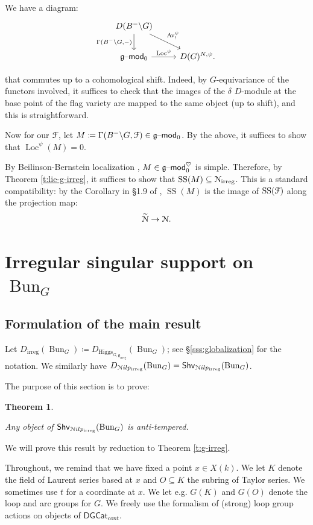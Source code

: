 \documentclass[reqno,11pt]{amsart}
\numberwithin{equation}{subsection}
\newtheorem{thm}{Theorem}[subsubsection]
\theoremstyle{remark}
\newcommand{\Loc}{\on{Loc}}
\newcommand{\sF}{{\EuScript F}}
\newcommand{\sN}{{\EuScript N}}
\newcommand{\fg}{{\mathfrak g}}
\newcommand{\on}{\operatorname}
\newcommand{\mathendash}{\text{\textendash}}
\newcommand{\Bun}{\on{Bun}}
\renewcommand{\mod}{\mathendash\mathsf{mod}}
\newcommand{\DGCat}{\mathsf{DGCat}}
\newcommand{\heart}{\heartsuit}
\newcommand{\Av}{\on{Av}}
\renewcommand{\subset}{\subseteq}
\newcommand{\Shv}{\mathsf{Shv}}
\newcommand{\Nilp}{\sN ilp}
\newcommand{\Higgs}{\on{Higgs}}
\newcommand{\irreg}{\on{irreg}}
\renewcommand{\SS}{\on{SS}}
\begin{document}
We have a diagram:
%
\[
\begin{tikzcd}
D(B^-\backslash G)
\arrow[d,swap,"{\Gamma(B^-\backslash G,-)}"]
\arrow[dr,"\Av_!^{\psi}"]
\\
\fg\mod_0
\arrow[r,"\Loc^{\psi}"] 
& 
D(G)^{N,\psi}. 
\end{tikzcd}
\]

\noindent that commutes up to a cohomological shift. 
Indeed, by $G$-equivariance of the functors involved,
it suffices to check that the images of the $\delta$ $D$-module
at the base point of the flag variety are mapped to the
same object (up to shift), and this is straightforward. 

Now for our $\sF$, let $M \coloneqq \Gamma(B^-\backslash G,\sF) \in \fg\mod_0$.
By the above, it suffices to show that $\Loc^{\psi}(M) = 0$.

By Beilinson-Bernstein localization \cite{bb-loc}, 
$M \in \fg\mod_0^{\heart}$ is simple. Therefore, 
by Theorem \ref{t:lie-g-irreg}, it suffices to show that
$\SS(M) \subset \sN_{\irreg}$.
This is a 
standard compatibility: by the Corollary in \S 1.9 of \cite{borho-brylinski}, 
$\SS(M)$ is the image of $\SS(\sF)$ along the projection map:
%
\[
\widetilde{\sN} \to \sN.
\]

\section{Irregular singular support on $\Bun_G$}\label{s:irreg-bun-g}

\subsection{Formulation of the main result}\label{ss:d-irreg-defin}

Let $D_{\irreg}(\Bun_G) \coloneqq D_{\Higgs_{G,\fg_{\irreg}}}(\Bun_G)$;
see \S \ref{sss:globalization} for the notation.
We similarly have $D_{\Nilp_{\irreg}}(\Bun_G) = \Shv_{\Nilp_{\irreg}}(\Bun_G)$.

The purpose of this section is to prove:

\begin{thm}\label{t:at}

Any object of $\Shv_{\Nilp_{\irreg}}(\Bun_G)$ is anti-tempered.

\end{thm}

We will prove this result by reduction to 
Theorem \ref{t:g-irreg}.

Throughout, we remind that we have fixed a point $x \in X(k)$.
We let $K$ denote the field of Laurent series based at $x$ and
$O \subset K$ the subring of Taylor series. We sometimes use
$t$ for a coordinate at $x$. We let e.g.
$G(K)$ and $G(O)$ denote the loop and arc groups for $G$.
We freely use the formalism of (strong) loop group actions 
on objects of $\DGCat_{cont}$.
\end{document}
